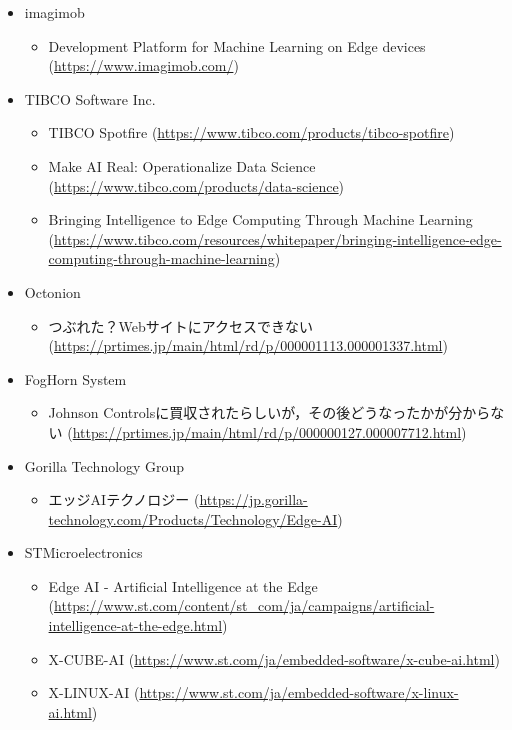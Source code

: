 \begin{itemize}
\begin{itemize}
\begin{itemize}
		\end{itemize}
		\item imagimob
		\begin{itemize}
			\item Development Platform for Machine Learning on Edge devices (\url{https://www.imagimob.com/})
		\end{itemize}
		\item TIBCO Software Inc.
		\begin{itemize}
			\item TIBCO Spotfire (\url{https://www.tibco.com/products/tibco-spotfire})
			\item Make AI Real: Operationalize Data Science (\url{https://www.tibco.com/products/data-science})
			\item Bringing Intelligence to Edge Computing Through Machine Learning (\url{https://www.tibco.com/resources/whitepaper/bringing-intelligence-edge-computing-through-machine-learning})
		\end{itemize}
		\item Octonion
		\begin{itemize}
			\item つぶれた？Webサイトにアクセスできない (\url{https://prtimes.jp/main/html/rd/p/000001113.000001337.html})
		\end{itemize}
		\item FogHorn System
		\begin{itemize}
			\item Johnson Controlsに買収されたらしいが，その後どうなったかが分からない (\url{https://prtimes.jp/main/html/rd/p/000000127.000007712.html})
		\end{itemize}
		\item Gorilla Technology Group
		\begin{itemize}
			\item エッジAIテクノロジー (\url{https://jp.gorilla-technology.com/Products/Technology/Edge-AI})
		\end{itemize}
		\item STMicroelectronics
		\begin{itemize}
			\item Edge AI - Artificial Intelligence at the Edge (\url{https://www.st.com/content/st_com/ja/campaigns/artificial-intelligence-at-the-edge.html})
			\item X-CUBE-AI (\url{https://www.st.com/ja/embedded-software/x-cube-ai.html})
			\item X-LINUX-AI (\url{https://www.st.com/ja/embedded-software/x-linux-ai.html})

\end{itemize}
\end{itemize}
\end{itemize}
